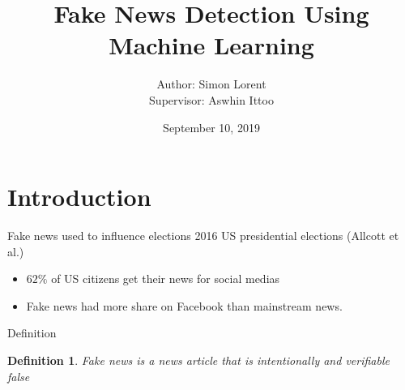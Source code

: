 \documentclass{beamer}
\title{Fake News Detection Using Machine Learning}
\date{September 10, 2019}
\author{Author: Simon Lorent \\ Supervisor: Aswhin Ittoo}
\institute{University Of Li\`ege}
\begin{document}
  \maketitle
  \section{Introduction}

  \begin{frame}{Fake news used to influence elections}
  2016 US presidential elections (Allcott et al.)\cite{Allcott2017}
	  \begin{itemize}
	 \item $62\%$ of US citizens get their news for social medias\cite{gottfried2016news}
	 \item Fake news had more share on Facebook than mainstream news\cite{silverman2016teens}.
	\end{itemize}
  \end{frame}

  \begin{frame}{Definition}
  \newtheorem{def:fake_news}{Definition}
	\begin{def:fake_news}
	Fake news is a news article that is intentionally and verifiable false\cite{shu2017fake}
	\end{def:fake_news}
  \end{frame}
\end{document}
